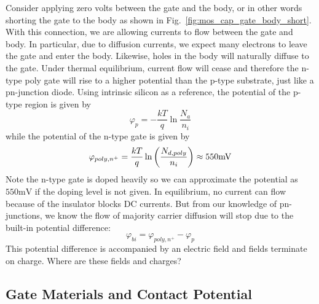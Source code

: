 Consider applying zero volts between the gate and the body, or in other words shorting the gate to the body as shown in Fig.~\ref{fig:mos_cap_gate_body_short}.   With this connection, we are allowing currents to flow between the gate and body.  In particular, due to diffusion currents, we expect many electrons to leave the gate and enter the body. Likewise, holes in the body will naturally diffuse to the gate.  Under thermal equilibrium, current flow will cease and therefore the n-type poly gate will rise to a higher potential than the p-type substrate, just like a pn-junction diode.  Using intrinsic silicon as a reference, the potential of the p-type region is given by
\begin{equation}
{\varphi _p} =  - \frac{{kT}}{q}\ln \frac{{{N_a}}}{{{n_i}}}
\end{equation}
while the potential of the n-type gate is given by
\begin{equation}
{\varphi _{poly,{n^ + }}} = \frac{{kT}}{q}\ln \left( {\frac{{{N_{d,poly}}}}{{{n_i}}}} \right) 
\approx 550{\rm{mV}}
\end{equation}
Note the n-type gate is doped heavily so we can approximate the potential as $550\mathrm{mV}$ if the doping level is not given.  In equilibrium, no current can flow because of the insulator blocks DC currents.  But from our knowledge of pn-junctions, we know the flow of majority carrier diffusion will stop due to the built-in potential difference:
\begin{equation}
	\varphi_{bi} = {\varphi _{poly,{n^ + }}}  - {\varphi _p} 
\end{equation}
This potential difference is accompanied by an electric field and fields terminate on charge.  Where are these fields and charges?
\subsection{Gate Materials and Contact Potential}
